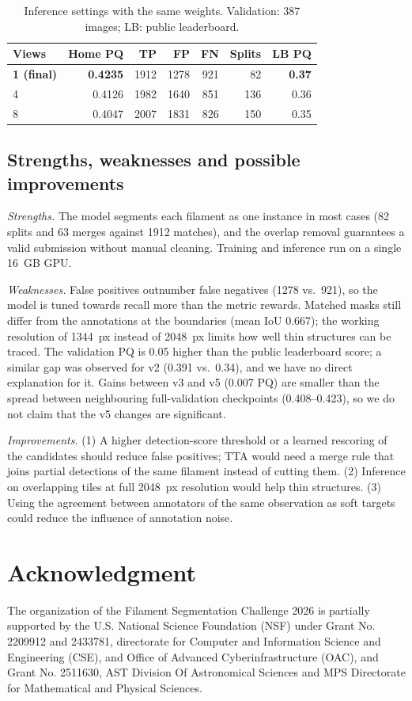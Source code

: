 \documentclass[sigconf]{acmart}
\begin{document}
\begin{table}[t]
\caption{Inference settings with the same weights. Validation: 387 images; LB: public leaderboard.}
\label{tab:tta}
\small
\begin{tabular}{@{}lrrrrrr@{}}
\toprule
Views & Home PQ & TP & FP & FN & Splits & LB PQ \\
\midrule
\textbf{1 (final)} & \textbf{0.4235} & 1912 & 1278 & 921 & 82 & \textbf{0.37} \\
4 & 0.4126 & 1982 & 1640 & 851 & 136 & 0.36 \\
8 & 0.4047 & 2007 & 1831 & 826 & 150 & 0.35 \\
\bottomrule
\end{tabular}
\end{table}


\subsection{Strengths, weaknesses and possible improvements}
    \textit{Strengths.} The model segments each filament as one instance in most cases (82 splits and 63 merges against 1912 matches), and the overlap removal guarantees a valid submission without manual cleaning. Training and inference run on a single 16~GB GPU.

    \textit{Weaknesses.} False positives outnumber false negatives (1278 vs.\ 921), so the model is tuned towards recall more than the metric rewards. Matched masks still differ from the annotations at the boundaries (mean IoU 0.667); the working resolution of 1344~px instead of 2048~px limits how well thin structures can be traced. The validation PQ is 0.05 higher than the public leaderboard score; a similar gap was observed for v2 (0.391 vs.\ 0.34), and we have no direct explanation for it. Gains between v3 and v5 (0.007 PQ) are smaller than the spread between neighbouring full-validation checkpoints (0.408--0.423), so we do not claim that the v5 changes are significant.

    \textit{Improvements.} (1) A higher detection-score threshold or a learned rescoring of the candidates should reduce false positives; TTA would need a merge rule that joins partial detections of the same filament instead of cutting them. (2) Inference on overlapping tiles at full 2048~px resolution would help thin structures. (3) Using the agreement between annotators of the same observation as soft targets could reduce the influence of annotation noise.

\section{Acknowledgment}\label{sec:acknowledgment}
    The organization of the Filament Segmentation Challenge 2026 is partially supported by the U.S. National Science Foundation (NSF) under Grant No. 2209912 and 2433781, directorate for Computer and Information Science and Engineering (CSE), and Office of Advanced Cyberinfrastructure (OAC), and Grant No. 2511630, AST Division Of Astronomical Sciences and MPS Directorate for Mathematical and Physical Sciences.
\end{document}
